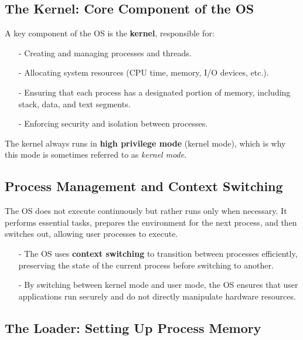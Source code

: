 \subsection{The Kernel: Core Component of the OS}

A key component of the OS is the \textbf{kernel}, responsible for:

\begin{itemize}
  \item[-] Creating and managing processes and threads.
  \item[-] Allocating system resources (CPU time, memory, I/O devices, etc.).
  \item[-] Ensuring that each process has a designated portion of memory, including stack, data, and text segments.
  \item[-] Enforcing security and isolation between processes.
\end{itemize}

The kernel always runs in \textbf{high privilege mode} (kernel mode), which is why this mode is sometimes referred to as \textit{kernel mode}. 

\subsection{Process Management and Context Switching}

The OS does not execute continuously but rather runs only when necessary. It performs essential tasks, prepares the environment for the next process, and then switches out, allowing user processes to execute.

\begin{itemize}
  \item[-] The OS uses \textbf{context switching} to transition between processes efficiently, preserving the state of the current process before switching to another.
  \item[-] By switching between kernel mode and user mode, the OS ensures that user applications run securely and do not directly manipulate hardware resources.
\end{itemize}

\subsection*{The Loader: Setting Up Process Memory}

